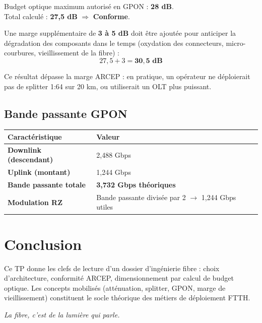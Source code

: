 \documentclass[11pt,a4paper]{article}
\begin{document}
\begin{infobox}[title={\faCheckCircle~Conformité ARCEP}]
Budget optique maximum autorisé en GPON : \textbf{28 dB}. \\
Total calculé : \textbf{27,5 dB} \(\Rightarrow\) \textcolor{accent}{\textbf{Conforme}}.
\end{infobox}

Une marge supplémentaire de \textbf{3 à 5 dB} doit être ajoutée pour anticiper la dégradation des composants dans le temps (oxydation des connecteurs, micro-courbures, vieillissement de la fibre) :
\[
27{,}5 + 3 = \mathbf{30{,}5 \text{ dB}}
\]

Ce résultat dépasse la marge ARCEP : en pratique, un opérateur ne déploierait pas de splitter 1:64 sur 20 km, ou utiliserait un OLT plus puissant.

\subsection{Bande passante GPON}

\begin{tabularx}{\linewidth}{@{}>{\bfseries}p{4cm} X@{}}
\toprule
\rowcolor{light} Caractéristique & Valeur \\ \midrule
Downlink (descendant)  & 2,488 Gbps \\
Uplink (montant)       & 1,244 Gbps \\
Bande passante totale  & \textbf{3,732 Gbps théoriques} \\
Modulation RZ          & Bande passante divisée par 2 \(\rightarrow\) 1,244 Gbps utiles \\
\bottomrule
\end{tabularx}

\section{Conclusion}

Ce TP donne les clefs de lecture d'un dossier d'ingénierie fibre : choix d'architecture, conformité ARCEP, dimensionnement par calcul de budget optique. Les concepts mobilisés (atténuation, splitter, GPON, marge de vieillissement) constituent le socle théorique des métiers de déploiement FTTH.

\vspace{0.5cm}
\begin{center}
{\sffamily\itshape\color{midgray}\large
\og La fibre, c'est de la lumière qui parle. \fg{}}
\end{center}
\end{document}
